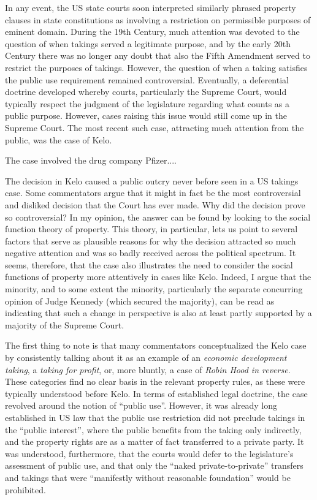 In any event, the US state courts soon interpreted similarly phrased property clauses in state constitutions as involving a restriction on permissible purposes of eminent domain. During the 19th Century, much attention was devoted to the question of when takings served a legitimate purpose, and by the early 20th Century there was no longer any doubt that also the Fifth Amendment served to restrict the purposes of takings. However, the question of when a taking satisfies the public use requirement remained controversial. Eventually, a deferential doctrine developed whereby courts, particularly the Supreme Court, would typically respect the judgment of the legislature regarding what counts as a public purpose. However, cases raising this issue would still come up in the Supreme Court. The most recent such case, attracting much attention from the public, was the case of Kelo.

The case involved the drug company Pfizer....


The decision in Kelo caused a public outcry never before seen in a US takings case. Some commentators argue that it might in fact be the most controversial and disliked decision that the Court has ever made. Why did the decision prove so controversial? In my opinion, the answer can be found by looking to the social function theory of property. This theory, in particular, lets us point to several factors that serve as plausible reasons for why the decision attracted so much negative attention and was so badly received across the political spectrum. It seems, therefore, that the case also illustrates the need to consider the social functions of property more attentively in cases like Kelo. Indeed, I argue that the minority, and to some extent the minority, particularly the separate concurring opinion of Judge Kennedy (which secured the majority), can be read as indicating that such a change in perspective is also at least partly supported by a majority of the Supreme Court. 

The first thing to note is that many commentators conceptualized the Kelo case by consistently talking about it as an example of an {\it economic development taking}, a {\it taking for profit}, or, more bluntly, a case of {\it Robin Hood in reverse}. These categories find no clear basis in the relevant property rules, as these were typically understood before Kelo. In terms of established legal doctrine, the case revolved around the notion of ``public use''. However, it was already long established in US law that the public use restriction did not preclude takings in the ``public interest'', where the public benefits from the taking only indirectly, and the property rights are as a matter of fact transferred to a private party. It was understood, furthermore, that the courts would defer to the legislature's assessment of public use, and that only the ``naked private-to-private'' transfers and takings that were ``manifestly without reasonable foundation'' would be prohibited. 

